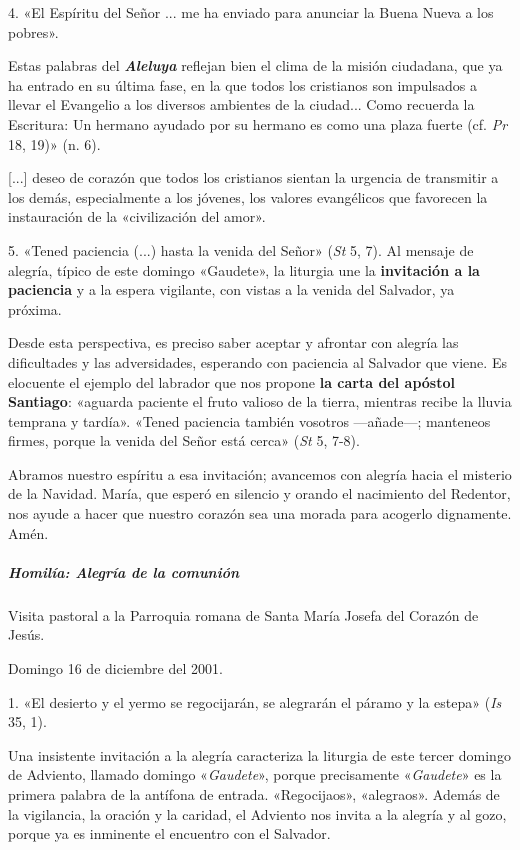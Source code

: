 \documentclass[]{article}
\let\oldsubparagraph\subparagraph
\renewcommand{\subparagraph}[1]{\oldsubparagraph{#1}\mbox{}}
\begin{document}
4. «El Espíritu del Señor ... me ha enviado para anunciar la Buena Nueva
a los pobres».

Estas palabras del \emph{\textbf{Aleluya}} reflejan bien el clima de la
misión ciudadana, que ya ha entrado en su última fase, en la que todos
los cristianos son impulsados a llevar el Evangelio a los diversos
ambientes de la ciudad... Como recuerda la Escritura: Un hermano ayudado
por su hermano es como una plaza fuerte (cf. \emph{Pr} 18, 19)» (n. 6).

{[}...{]} deseo de corazón que todos los cristianos sientan la urgencia
de transmitir a los demás, especialmente a los jóvenes, los valores
evangélicos que favorecen la instauración de la «civilización del amor».

5. «Tened paciencia (...) hasta la venida del Señor» (\emph{St} 5, 7).
Al mensaje de alegría, típico de este domingo «Gaudete», la liturgia une
la \textbf{invitación a la paciencia} y a la espera vigilante, con
vistas a la venida del Salvador, ya próxima.

Desde esta perspectiva, es preciso saber aceptar y afrontar con alegría
las dificultades y las adversidades, esperando con paciencia al Salvador
que viene. Es elocuente el ejemplo del labrador que nos propone
\textbf{la carta del apóstol Santiago}: «aguarda paciente el fruto
valioso de la tierra, mientras recibe la lluvia temprana y tardía».
«Tened paciencia también vosotros ---añade---; manteneos firmes, porque
la venida del Señor está cerca» (\emph{St} 5, 7-8).

Abramos nuestro espíritu a esa invitación; avancemos con alegría hacia
el misterio de la Navidad. María, que esperó en silencio y orando el
nacimiento del Redentor, nos ayude a hacer que nuestro corazón sea una
morada para acogerlo dignamente. Amén.

\protect\hypertarget{_Toc448662746}{}{\protect\hypertarget{_Toc448690265}{}{}}

\subparagraph{Homilía: Alegría de la
comunión}\label{homiluxeda-alegruxeda-de-la-comuniuxf3n}

Visita pastoral a la Parroquia romana de Santa María Josefa del Corazón
de Jesús.

Domingo 16 de diciembre del 2001.

1. «El desierto y el yermo se regocijarán, se alegrarán el páramo y la
estepa» (\emph{Is} 35, 1).

Una insistente invitación a la alegría caracteriza la liturgia de este
tercer domingo de Adviento, llamado domingo «\emph{Gaudete}», porque
precisamente «\emph{Gaudete}» es la primera palabra de la antífona de
entrada. «Regocijaos», «alegraos». Además de la vigilancia, la oración y
la caridad, el Adviento nos invita a la alegría y al gozo, porque ya es
inminente el encuentro con el Salvador.
\end{document}
